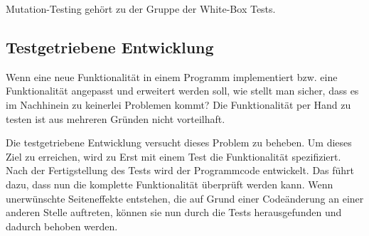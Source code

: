 Mutation-Testing gehört zu der Gruppe der White-Box Tests.

\subsection{Testgetriebene Entwicklung}
Wenn eine neue Funktionalität in einem Programm implementiert bzw. eine Funktionalität angepasst und erweitert werden soll, wie stellt man sicher, dass es im Nachhinein zu keinerlei Problemen kommt? Die Funktionalität per Hand zu testen ist aus mehreren Gründen nicht vorteilhaft.

Die testgetriebene Entwicklung versucht dieses Problem zu beheben. Um dieses Ziel zu erreichen, wird zu Erst mit einem Test die Funktionalität spezifiziert. Nach der Fertigstellung des Tests wird der Programmcode entwickelt. Das führt dazu, dass nun die komplette Funktionalität überprüft werden kann. Wenn unerwünschte Seiteneffekte entstehen, die auf Grund einer Codeänderung an einer anderen Stelle auftreten, können sie nun durch die Tests herausgefunden und dadurch behoben werden.






